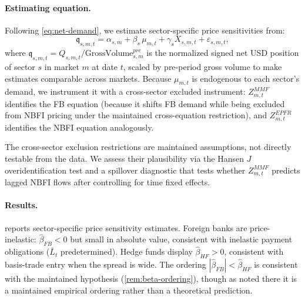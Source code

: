 \paragraph{Estimating equation.} Following \cref{eq:net-demand}, we estimate
sector-specific price sensitivities from:
\begin{equation}
  \mathfrak{q}_{s,m,t} = \alpha_{s,m} + \beta_s\,\mu_{m,t} +
  \gamma_s X_{s,m,t} + \varepsilon_{s,m,t},
  \label{eq:ds-estimation}
\end{equation}
where $\mathfrak{q}_{s,m,t} = Q_{s,m,t} / \text{GrossVolume}_{s,m}^{pre}$ is the
normalized signed net USD position of sector $s$ in market $m$ at date $t$,
scaled by pre-period gross volume to make estimates comparable across markets.
Because $\mu_{m,t}$ is endogenous to each sector's demand, we instrument it
with a cross-sector excluded instrument: $Z_{m,t}^{MMF}$ identifies the FB
equation (because it shifts FB demand while being excluded from NBFI pricing
under the maintained cross-equation restriction), and $Z_{m,t}^{EPFR}$ identifies
the NBFI equation analogously.

The cross-sector exclusion restrictions are maintained assumptions, not directly
testable from the data. We assess their plausibility via the Hansen $J$
overidentification test and a spillover diagnostic that tests whether
$Z_{m,t}^{MMF}$ predicts lagged NBFI flows after controlling for time fixed
effects.

\paragraph{Results.}  reports sector-specific price
sensitivity estimates. Foreign banks are price-inelastic: $\hat\beta_{FB} < 0$
but small in absolute value, consistent with inelastic payment obligations
($\bar{L}_t$ predetermined). Hedge funds display $\hat\beta_{HF} > 0$, consistent
with basis-trade entry when the spread is wide. The ordering $|\hat\beta_{FB}|
< \hat\beta_{HF}$ is consistent with the maintained hypothesis (\cref{rem:beta-ordering}),
though as noted there it is a maintained empirical
ordering rather than a theoretical prediction.

